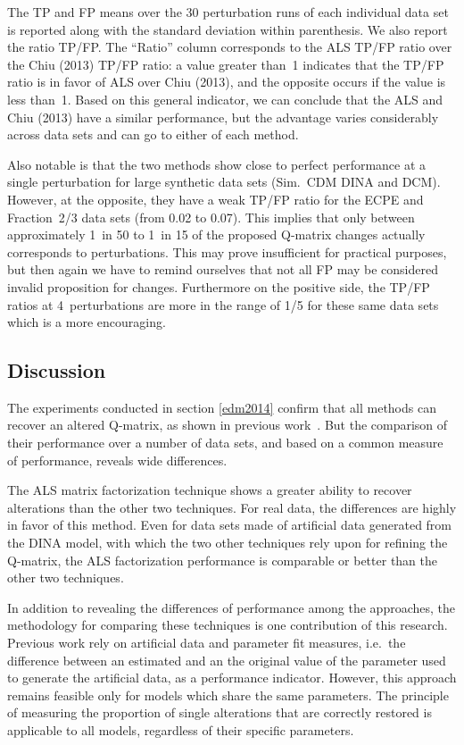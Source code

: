 The TP and FP means over the 30 perturbation runs of each individual data set is reported along with
the standard deviation within parenthesis.  We also report the ratio TP/FP. The ``Ratio'' column corresponds to the ALS TP/FP
ratio over the Chiu (2013) TP/FP ratio: a value greater than~1 indicates that the TP/FP ratio is in favor of ALS over Chiu (2013), and
the opposite occurs if the value is less than~1.  Based on this general indicator, we can conclude that the ALS and Chiu (2013) have a
similar performance, but the advantage varies considerably across data sets and can go to either of each method.

Also notable is that the two methods show close to perfect performance at a single perturbation for large synthetic data sets
(Sim.~CDM DINA and DCM).  However, at the opposite, they have a weak TP/FP ratio for the ECPE and Fraction~2/3 data sets (from
0.02 to 0.07).  This implies that only between approximately 1~in 50 to 1~in 15 of the proposed Q-matrix changes actually
corresponds to perturbations.  This may prove insufficient for practical purposes, but then again we have to remind ourselves
that not all FP may be considered invalid proposition for changes.  Furthermore on the positive side, the TP/FP ratios at
4~perturbations are more in the range of 1/5 for these same data sets which is a more encouraging.


\subsection{Discussion}

The experiments conducted in section \ref{edm2014} confirm that all methods can recover an altered Q-matrix, as shown in previous work~\cite{delaTorre2008,chiu2013statistical,Desmarais2013aied}. But the comparison of their performance over a number of data sets, and based on a common measure of performance, reveals wide differences.

The ALS matrix factorization technique shows a greater ability to recover alterations than the other two techniques.  For real data, the differences are highly in favor of this method.  Even for data sets made of artificial data generated from the DINA model, with which the two other techniques rely upon for refining the Q-matrix, the ALS factorization performance is comparable or better than the other two techniques.

In addition to revealing the differences of performance among the approaches, the methodology for comparing these techniques is one contribution of this research. Previous work rely on artificial data and parameter fit measures, i.e.\ the difference between an estimated and an the original value of the parameter used to generate the artificial data, as a performance indicator.  However, this approach remains feasible only for models which share the same parameters.  The principle of measuring the proportion of single alterations that are correctly restored is applicable to all models, regardless of their specific parameters.  


